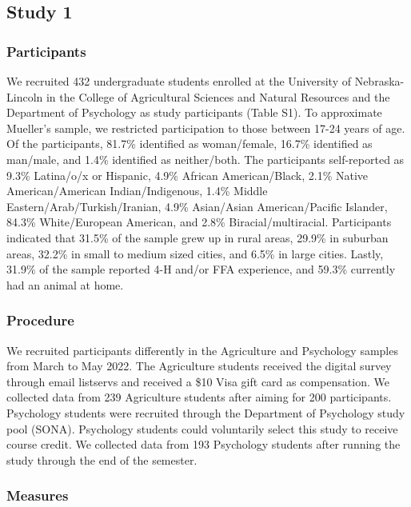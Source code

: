 \documentclass[
  jou,
  longtable,
  nolmodern,
  notxfonts,
  notimes,
  colorlinks=true,linkcolor=blue,citecolor=blue,urlcolor=blue]{apa7}
\begin{document}
\subsection{Study 1}\label{study-1}

\subsubsection{Participants}\label{participants}

We recruited 432 undergraduate students enrolled at the University of
Nebraska-Lincoln in the College of Agricultural Sciences and Natural
Resources and the Department of Psychology as study participants (Table
S1). To approximate Mueller's sample, we restricted participation to
those between 17-24 years of age. Of the participants, 81.7\% identified
as woman/female, 16.7\% identified as man/male, and 1.4\% identified as
neither/both. The participants self-reported as 9.3\% Latina/o/x or
Hispanic, 4.9\% African American/Black, 2.1\% Native American/American
Indian/Indigenous, 1.4\% Middle Eastern/Arab/Turkish/Iranian, 4.9\%
Asian/Asian American/Pacific Islander, 84.3\% White/European American,
and 2.8\% Biracial/multiracial. Participants indicated that 31.5\% of
the sample grew up in rural areas, 29.9\% in suburban areas, 32.2\% in
small to medium sized cities, and 6.5\% in large cities. Lastly, 31.9\%
of the sample reported 4-H and/or FFA experience, and 59.3\% currently
had an animal at home.

\subsubsection{Procedure}\label{procedure}

We recruited participants differently in the Agriculture and Psychology
samples from March to May 2022. The Agriculture students received the
digital survey through email listservs and received a \$10 Visa gift
card as compensation. We collected data from 239 Agriculture students
after aiming for 200 participants. Psychology students were recruited
through the Department of Psychology study pool (SONA). Psychology
students could voluntarily select this study to receive course credit.
We collected data from 193 Psychology students after running the study
through the end of the semester.

\subsubsection{Measures}\label{measures}
\end{document}
